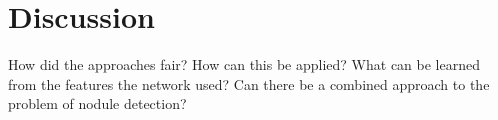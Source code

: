 \documentclass[main.tex]{subfiles}
\begin{document}
\chapter{Discussion}
How did the approaches fair?
How can this be applied?
What can be learned from the features the network used?
Can there be a combined approach to the problem of nodule detection?


\end{document}
